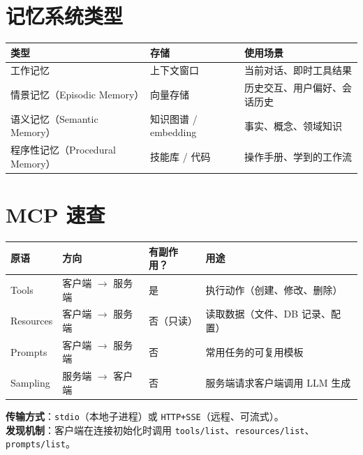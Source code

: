 \section{记忆系统类型}
\label{memory-system-types}

\noindent\begin{tabularx}{\linewidth}{@{}l Z{0.82} Z{1.18}@{}}
\toprule
\textbf{类型} & \textbf{存储} & \textbf{使用场景} \\
\midrule
工作记忆 & 上下文窗口 & 当前对话、即时工具结果 \\
情景记忆（Episodic Memory） & 向量存储 & 历史交互、用户偏好、会话历史 \\
语义记忆（Semantic Memory） & 知识图谱 / embedding & 事实、概念、领域知识 \\
程序性记忆（Procedural Memory） & 技能库 / 代码 & 操作手册、学到的工作流 \\
\bottomrule
\end{tabularx}

\section{MCP 速查}
\label{mcp-quick-reference}

\begin{center}
\begin{tabularx}{0.88\linewidth}{@{}l Z{0.85} Z{0.38} Z{1.77}@{}}
\toprule
\textbf{原语} & \textbf{方向} & \textbf{有副作用？} & \textbf{用途} \\
\midrule
Tools & 客户端 $\to$ 服务端 & 是 & 执行动作（创建、修改、删除） \\
Resources & 客户端 $\to$ 服务端 & 否（只读） & 读取数据（文件、DB 记录、配置） \\
Prompts & 客户端 $\to$ 服务端 & 否 & 常用任务的可复用模板 \\
Sampling & 服务端 $\to$ 客户端 & 否 & 服务端请求客户端调用 LLM 生成 \\
\bottomrule
\end{tabularx}
\end{center}

\textbf{传输方式}：\texttt{stdio}（本地子进程）或 \texttt{HTTP+SSE}（远程、可流式）。\\

\textbf{发现机制}：客户端在连接初始化时调用 \texttt{tools/list}、\texttt{resources/list}、\texttt{prompts/list}。\\

